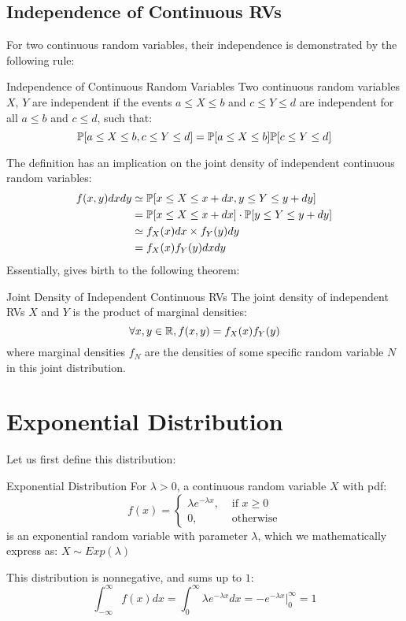 \subsection{Independence of Continuous RVs}
For two continuous random variables, their independence is demonstrated by the following rule:
\begin{ln-define}{Independence of Continuous Random Variables}{}
    Two continuous random variables $X$, $Y$ are independent if the events $a \leq X \leq b$ and $c \leq Y \leq d$ are independent for all $a \leq b$ and $c \leq d$, such that:
    \[
        \P[a \leq X \leq b, c \leq Y \leq d] = \P[a \leq X \leq b] \P[c \leq Y \leq d]
    \]
\end{ln-define}
The definition has an implication on the joint density of independent continuous random variables:
\begin{align*}
    f(x, y) dx dy
    &\simeq \P[x \leq X \leq x + dx, y \leq Y \leq y + dy] \\
    &= \P[x \leq X \leq x + dx] \cdot \P[y \leq Y \leq y + dy] \\
    &\simeq f_X(x) dx \times f_Y(y) dy \\
    &= f_X(x) f_Y(y) dx dy
\end{align*}
Essentially, gives birth to the following theorem:
\begin{ln-theorem}{Joint Density of Independent Continuous RVs}{}
    The joint density of independent RVs $X$ and $Y$ is the product of marginal densities:
    \[
        \forall x, y \in \R, f(x, y) = f_X(x) f_Y(y)
    \]
    where marginal densities $f_N$ are the densities of some specific random variable $N$ in this joint distribution.
\end{ln-theorem}

\section{Exponential Distribution}
Let us first define this distribution:
\begin{ln-define}{Exponential Distribution}{}
    For $\lambda > 0$, a continuous random variable $X$ with pdf:
    \[
        f(x) = 
        \begin{cases}
            \lambda e^{-\lambda x}, &\text{ if $x \geq 0$} \\
            0, &\text{ otherwise}
        \end{cases}
    \]
        is an exponential random variable with parameter $\lambda$, which we mathematically express as:
        $X \sim Exp(\lambda)$
\end{ln-define}
This distribution is nonnegative, and sums up to $1$:
\[
    \int_{-\infty}^{\infty} f(x) dx = \int_0^{\infty} \lambda e^{-\lambda x} dx = -e^{-\lambda x} {\bigg|}_0^{\infty} = 1
\]

